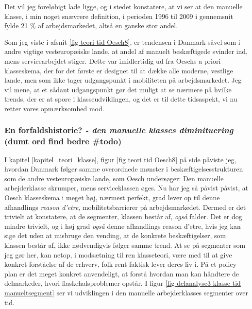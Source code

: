 Det vil jeg foreløbigt lade ligge, og i stedet konstatere, at vi ser at den manuelle klasse, i min noget snævrere definition, i perioden 1996 til 2009 i gennemsnit fylde 21 \% af arbejdsmarkedet, altså en ganske stor andel. 

Som jeg viste i afsnit \ref{fig teori tid Oesch8}, er tendensen i Danmark såvel som i andre vigtige vesteuropæiske lande, at andel af manuelt beskæftigede svinder ind, mens servicearbejdet stiger. Dette var imidlertidig ud fra Oeschs a priori klasseskema, der for det første er designet til at dække alle moderne, vestlige lande, men som ikke tager udgangspunkt i mobiliteten på arbejdsmarkedet. Jeg vil mene, at et sådant udgangspunkt gør det muligt at se nærmere på hvilke trends, der er at spore i klasseudviklingen, og det er til dette tidsaspekt, vi nu retter vores opmærksomhed mod.


%
\subsubsection{En forfaldshistorie? \emph{- den manuelle klasses diminituering} (dumt ord find bedre \#todo)}
%
 

I kapitel \ref{kapitel_teori_klasse}, figur \ref{fig teori tid Oesch8} på side \pageref{fig teori tid Oesch8} påviste jeg, hvordan Danmark følger samme overordnede mønster i beskæftigelsesstrukturen som de andre vesteuropæiske lande, som Oesch undersøger: Den manuelle arbejderklasse skrumper, mens serviceklassen øges. Nu har jeg så påvist påvist, at Oesch klasseskema i meget høj, nærmest perfekt, grad lever op til denne afhandlings \emph{reason d'etre}, mobilitetsbarrierer på arbejdsmarkedet. Dermed er det trivielt at konstatere, at de segmenter, klassen består af, \emph{også} falder. Det er dog mindre trivielt, og i høj grad \emph{også} denne afhandlings reason d'etre, hvis jeg kan sige det uden at misbruge den vending, at de konkrete beskæftigelser, som klassen består af, ikke nødvendigvis følger samme trend. At se på segmenter som jeg gør her, kan netop, i modsætning til ren klasseteori, være med til at give konkret forståelse af de erhverv, folk rent faktisk lever deres liv i. På et policy-plan er det meget konkret anvendeligt, at forstå hvordan man kan håndtere de delmarkeder, hvori flaskehalsproblemer opstår. I figur \ref{fig delanalyse3 klasse tid manueltsegment} ser vi udviklingen i den manuelle arbejderklasses segmenter over tid. 

